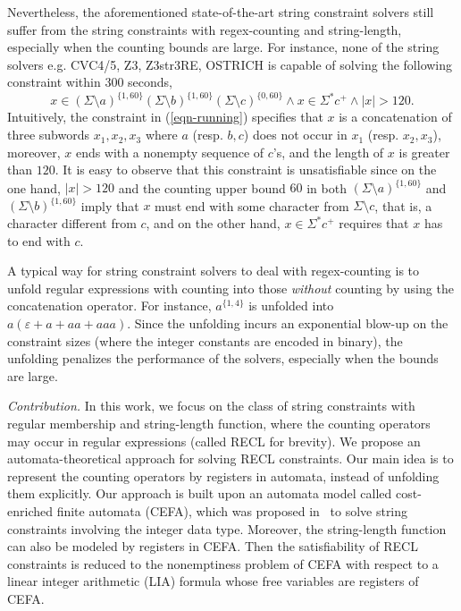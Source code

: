 Nevertheless, the aforementioned state-of-the-art string constraint solvers still suffer from the string constraints with regex-counting and string-length, especially when the counting bounds are large. For instance, none of the string solvers e.g. CVC4/5, Z3, Z3str3RE, OSTRICH is capable of solving the following constraint within 300 seconds,
%
\begin{equation}\label{eqn-running}
x \in (\Sigma \setminus a)^{\{1, 60\}} (\Sigma \setminus b)^{\{1, 60\}} (\Sigma \setminus c)^{\{0, 60\}} \wedge x \in \Sigma^* c^+ \wedge |x| > 120.
\end{equation}
Intuitively, the constraint in (\ref{eqn-running}) specifies that $x$ is a concatenation of three subwords $x_1, x_2, x_3$ where $a$ (resp. $b, c$) does not occur in $x_1$ (resp. $x_2, x_3$), moreover, $x$ ends with a nonempty sequence of $c$'s, and the length of $x$ is greater than $120$. It is easy to observe that this constraint is unsatisfiable since on the one hand, $|x| > 120$ and the counting upper bound $60$ in both $(\Sigma \setminus a)^{\{1, 60\}}$ and $(\Sigma \setminus b)^{\{1, 60\}}$ imply that $x$ must end with some character from $\Sigma \setminus c$, that is, a character different from $c$, and on the other hand, $x \in \Sigma^*c^+$ requires that $x$ has to end with $c$.

A typical way for string constraint solvers to deal with regex-counting is to unfold regular expressions with counting into those \emph{without} counting by using the concatenation operator. For instance, $a^{\{1, 4\}}$ is unfolded into $a(\varepsilon + a + aa + aaa)$. Since the unfolding incurs an exponential blow-up on the constraint sizes (where the integer constants are encoded in binary), the unfolding penalizes the performance of the solvers, especially when the bounds are large. 


\medskip
\noindent 
\emph{Contribution.} In this work, we focus on the class of string constraints with regular membership and string-length function, where the counting operators may occur in regular expressions (called RECL for brevity). We propose an automata-theoretical approach for solving RECL constraints. Our main idea is to represent the counting operators by registers in automata, instead of unfolding them explicitly. Our approach is built upon an automata model called cost-enriched finite automata (CEFA), which was proposed in~\cite{atva2020} to solve string constraints involving the integer data type. Moreover, the string-length function can also be modeled by registers in CEFA. Then the satisfiability of RECL constraints is reduced to the nonemptiness problem of CEFA with respect to a linear integer arithmetic (LIA) formula whose free variables are registers of CEFA. 

